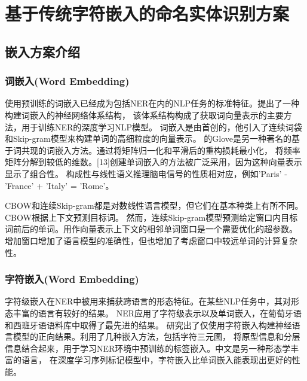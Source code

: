 

\chapter{基于传统字符嵌入的命名实体识别方案}

\section{嵌入方案介绍}

\subsection{词嵌入(Word Embedding)}

使用预训练的词嵌入已经成为包括NER在内的NLP任务的标准特征。\parencite{collobert2011natural}提出了一种构建词嵌入的神经网络体系结构，
该体系结构构成了获取词向量表示的主要方法，用于训练NER的深度学习NLP模型。
词嵌入是由\parencite{mikolov2013efficient}首创的，他引入了连续词袋和Skip-gram模型来构建单词的高细粒度的向量表示。
\parencite{pennington2014glove}的Glove是另一种著名的基于词共现的词嵌入方法。通过将矩阵归一化和平滑后的重构损耗最小化，
将频率矩阵分解到较低的维数。[13]创建单词嵌入的方法被广泛采用，因为这种向量表示显示了组合性。
构成性与线性语义推理脑电信号的性质相对应，例如'Paris' - 'France' + 'Italy' = 'Rome'。

CBOW和连续Skip-gram都是对数线性语言模型，但它们在基本种类上有所不同。CBOW根据上下文预测目标词。
然而，连续Skip-gram模型预测给定窗口内目标词前后的单词。用作向量表示上下文的相邻单词窗口是一个需要优化的超参数。
增加窗口增加了语言模型的准确性，但也增加了考虑窗口中较远单词的计算复杂性。



\subsection{字符嵌入(Word Embedding)}

字符级嵌入在NER中被用来捕获跨语言的形态特征。在某些NLP任务中，其对形态丰富的语言有较好的结果。
\parencite{santos2015boosting}NER应用了字符级表示以及单词嵌入，在葡萄牙语和西班牙语语料库中取得了最先进的结果。
\parencite{kim2016character}研究出了仅使用字符嵌入构建神经语言模型的正向结果。\parencite{ma2016end}利用了几种嵌入方法，包括字符三元图，
将原型信息和分层信息结合起来，用于学习NER环境中预训练的标签嵌入。中文是另一种形态学丰富的语言，
在深度学习序列标记模型中，字符嵌入比单词嵌入能表现出更好的性能\parencite{zheng2013deep}。

